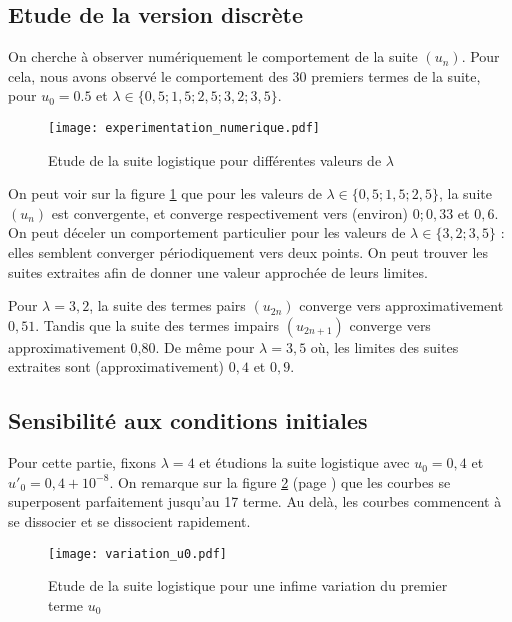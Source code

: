 \subsection{Etude de la version discrète}
On cherche à observer numériquement le comportement de la suite $(u_n)$. Pour cela, nous avons observé le comportement des $30$ premiers termes de la suite, pour $u_0 = 0.5$ et $\lambda\in\{0,5; 1,5; 2,5; 3,2; 3,5\}$.

\begin{figure}[!ht]
    \begin{center}
        \texttt{[image: experimentation\_numerique.pdf]}
    \end{center}
    \caption{Etude de la suite logistique pour différentes valeurs de $\lambda$}
    \label{fig:etude_lambdas}
\end{figure}
On peut voir sur la figure \ref{fig:etude_lambdas} que pour les valeurs de $\lambda\in\{0,5; 1,5; 2,5\}$, la suite $(u_n)$ est convergente, et converge respectivement vers (environ) $0; 0,33$ et $0,6$. On peut déceler un comportement particulier pour les valeurs de $\lambda \in\{3,2; 3,5\}$ : elles semblent converger périodiquement vers deux points. On peut trouver les suites extraites afin de donner une valeur approchée de leurs limites.

Pour $\lambda = 3,2$, la suite des termes pairs $(u_{2n})$ converge vers approximativement $0,51$. Tandis que la suite des termes impairs $(u_{2n+1})$ converge vers approximativement 0,80. De même pour $\lambda = 3,5$ où, les limites des suites extraites sont (approximativement) $0,4$ et $0,9$.

\subsection{Sensibilité aux conditions initiales}
Pour cette partie, fixons $\lambda = 4$ et étudions la suite logistique avec $u_0 = 0,4$ et $u'_0 = 0,4 + 10^{-8}$. On remarque sur la figure \ref{fig:etude_u0} (page \pageref{fig:etude_u0}) que les courbes se superposent parfaitement jusqu'au 17\ieme{} terme. Au delà, les courbes commencent à se dissocier et se dissocient rapidement.

\begin{figure}[!ht]
    \begin{center}
        \texttt{[image: variation\_u0.pdf]}
    \end{center}
    \caption{Etude de la suite logistique pour une infime variation du premier terme $u_0$}
    \label{fig:etude_u0}
\end{figure}


